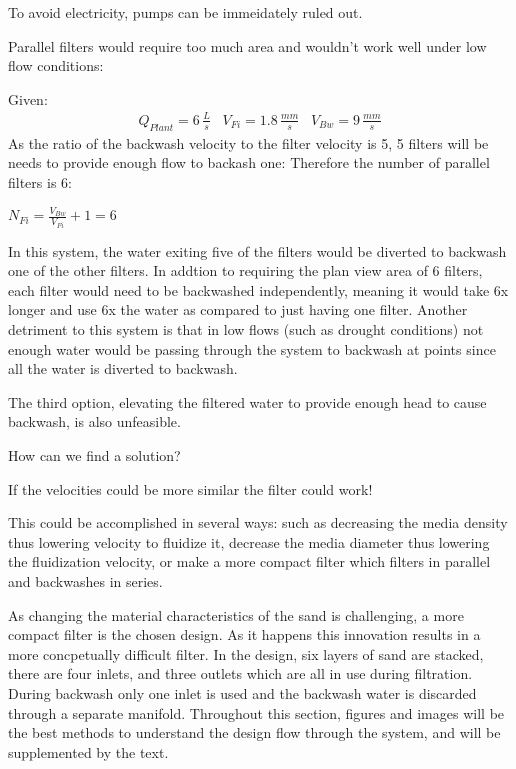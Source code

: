 \documentclass[letterpaper,10pt,english]{sphinxmanual}
\begin{document}
{

To avoid electricity, pumps can be immeidately ruled out.

Parallel filters would require too much area and wouldn’t work well under low flow conditions:

Given:
\begin{equation}\label{equation:Filtration/Filtration_Design:filter_base_conditions}
\begin{split}  Q_{Plant} = 6 \, \frac{L}{s} \,\,\,\,\, V_{Fi} = 1.8 \, \frac{mm}{s} \,\,\,\,\, V_{Bw} = 9 \, \frac{mm}{s}\end{split}
\end{equation}
As the ratio of the backwash velocity to the filter velocity is 5, 5 filters will be needs to provide enough flow to backash one: Therefore the number of parallel filters is 6:

\(N_{Fi} = \frac{V_{Bw}}{V_{Fi}} + 1 = 6\)

In this system, the water exiting five of the filters would be diverted to backwash one of the other filters. In addtion to requiring the plan view area of 6 filters, each filter would need to be backwashed independently, meaning it would take 6x longer and use 6x the water as compared to just having one filter. Another detriment to this system is that in low flows (such as drought conditions) not enough water would be passing through the system to backwash at points since all the water is diverted to backwash.

The third option, elevating the filtered water to provide enough head to cause backwash, is also unfeasible.


How can we find a solution?

If the velocities could be more similar the filter could work!

This could be accomplished in several ways: such as decreasing the media density thus lowering velocity to fluidize it, decrease the media diameter thus lowering the fluidization velocity, or make a more compact filter which filters in parallel and backwashes in series.

As changing the material characteristics of the sand is challenging, a more compact filter is the chosen design. As it happens this innovation results in a more concpetually difficult filter. In the design, six layers of sand are stacked, there are four inlets, and three outlets which are all in use during filtration. During backwash only one inlet is used and the backwash water is discarded through a separate manifold. Throughout this section, figures and images will be the best methods to understand the design flow through the system, and will be supplemented by the text.

}
\end{document}
